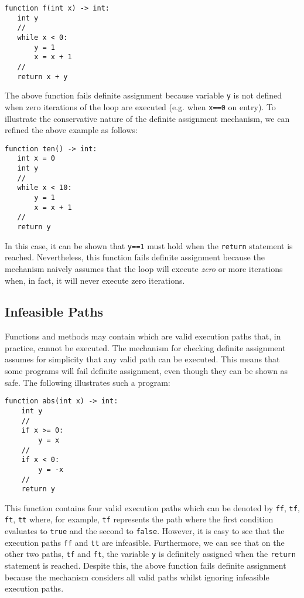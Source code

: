 \begin{lstlisting}
function f(int x) -> int:
   int y
   //
   while x < 0:
       y = 1
       x = x + 1
   //
   return x + y
\end{lstlisting}

The above function fails definite assignment because variable \lstinline{y} is not defined when zero iterations of the loop are executed (e.g. when \lstinline{x==0} on entry).  To illustrate the conservative nature of the definite assignment mechanism, we can refined the above example as follows:

\begin{lstlisting}
function ten() -> int:
   int x = 0
   int y
   //
   while x < 10:
       y = 1
       x = x + 1
   //
   return y
\end{lstlisting}

In this case, it can be shown that \lstinline{y==1} must hold when the \lstinline{return} statement is reached.  Nevertheless, this function fails definite assignment because the mechanism naively assumes that the loop will execute {\em zero} or more iterations when, in fact, it will never execute zero iterations.

\subsection{Infeasible Paths}

Functions and methods may contain  which are valid execution paths that, in practice, cannot be executed.  The mechanism for checking definite assignment assumes for simplicity that any valid path can be executed.  This means that some programs will fail definite assignment, even though they can be shown as safe.   The following illustrates such a program:

\begin{lstlisting}
function abs(int x) -> int:
    int y
    //
    if x >= 0:
        y = x
    //
    if x < 0:
        y = -x
    //
    return y
\end{lstlisting}

This function contains four valid execution paths which can be denoted by \lstinline{ff}, \lstinline{tf}, \lstinline{ft}, \lstinline{tt} where, for example, \lstinline{tf} represents the path where the first condition evaluates to \lstinline{true} and the second to \lstinline{false}.  However, it is easy to see that the execution paths \lstinline{ff} and \lstinline{tt} are infeasible.  Furthermore, we can see that on the other two paths, \lstinline{tf} and \lstinline{ft}, the variable \lstinline{y} is definitely assigned when the \lstinline{return} statement is reached.  Despite this, the above function fails definite assignment because the mechanism considers all valid paths whilst ignoring infeasible execution paths.

